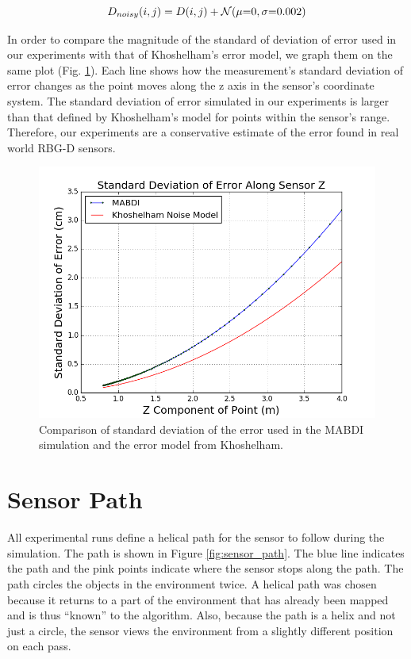 \begin{equation}
  D_{noisy}(i,j) = D(i,j) + \mathcal{N} (\mu\mathsmaller{=}0, \sigma\mathsmaller{=}0.002)
  \label{eqn:depth_noise}
\end{equation}

In order to compare the magnitude of the standard of deviation of error used in
our experiments with that of Khoshelham's error model, we graph them on the same
plot (Fig. \ref{fig:depth_noise_error}). Each line shows how the measurement's
standard deviation of error changes as the point moves along the z axis in the
sensor's coordinate system. The standard deviation of error simulated in our
experiments is larger than that defined by Khoshelham's model for points within
the sensor's range. Therefore, our experiments are a conservative estimate of
the error found in real world RBG-D sensors.

\begin{figure}[h]%
\centering
  \includegraphics[width=.70\textwidth]{figures/depth_noise_error.png}
  \caption{Comparison of standard deviation of the error used in the MABDI simulation and the error model from Khoshelham.}
  \label{fig:depth_noise_error}
\end{figure}

\section{Sensor Path}

All experimental runs define a helical path for the sensor to follow during the
simulation. The path is shown in Figure \ref{fig:sensor_path}. The blue line
indicates the path and the pink points indicate where the sensor stops along the
path. The path circles the objects in the environment twice. A helical path was
chosen because it returns to a part of the environment that has already been
mapped and is thus ``known'' to the algorithm. Also, because the path is a
helix and not just a circle, the sensor views the environment from a slightly
different position on each pass.

